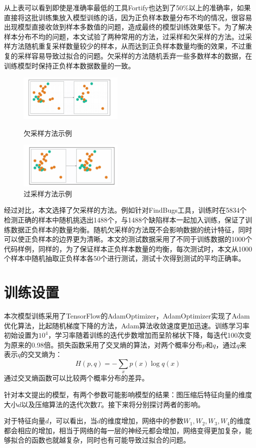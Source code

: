 从上表可以看到即使是准确率最低的工具Fortify也达到了50\%以上的准确率，如果直接将这批训练集放入模型训练的话，因为正负样本数量分布不均的情况，很容易出现模型直接收敛到样本多数值的问题，造成最终的模型训练效果低下。为了解决样本分布不均的问题，本文试验了两种常用的方法，过采样和欠采样的方法。过采样方法随机重复采样数量较少的样本，从而达到正负样本数量均衡的效果，不过重复的采样容易导致过拟合的问题。欠采样的方法随机丢弃一些多数样本的数据，在训练模型时保持正负样本数据数量的一致。
\begin{figure}[h]
\parbox[h]{.5\textwidth}{\centering
\includegraphics[width=0.45\textwidth]{figures/7.pdf}
\caption{欠采样方法示例}}
\parbox[h]{.5\textwidth}{\centering
\includegraphics[width=0.45\textwidth]{figures/8.pdf}
\caption{过采样方法示例}}
\end{figure}

经过对比，本文选择了欠采样的方法。例如针对FindBugs工具，训练时在5834个检测正确的样本中随机挑选出1488个，与1488个缺陷样本一起加入训练，保证了训练数据正负样本的数量均衡。随机欠采样的方法既不会影响数据的统计特征，同时可以使正负样本的边界更为清晰。本文的测试数据采用了不同于训练数据的1000个代码样例，同样的，为了保证样本正负样本数量的均衡，每次测试时，本文从1000个样本中随机抽取正负样本各50个进行测试，测试十次得到测试的平均正确率。

\section{训练设置}
本次模型训练采用了TensorFlow的AdamOptimizer，AdamOptimizer实现了Adam优化算法，比起随机梯度下降的方法，Adam算法收敛速度更加迅速。训练学习率初始设置为$10^{4}$，学习率随着训练的迭代步数增加而呈阶梯状下降，每迭代100次变为原来的0.98倍。损失函数采用了交叉熵的算法，对两个概率分布$p$和$q$，通过$q$来表示$q$的交叉熵为：
$$H(p,q) = -\sum_x p(x)\log q(x)$$
通过交叉熵函数可以比较两个概率分布的差异。

针对本文提出的模型，有两个参数可能影响模型的结果：图压缩后特征向量的维度大小$d$以及压缩算法的迭代次数$T$。接下来将分别探讨两者的影响。


对于特征向量$d$，可以看出，当$d$的维度增加，网络中的参数$W_1, W_2, W_3, W_4$的维度都会相应的增加，相当于网络的每一层的神经元都会增加，网络变得更加复杂，能够拟合的函数也就越复杂，同时也有可能导致过拟合的问题。
